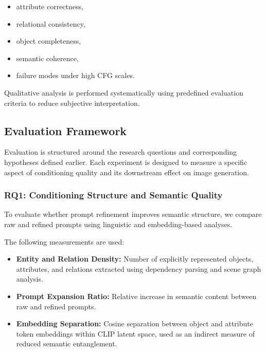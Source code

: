 \documentclass[a4paper,twoside,12pt]{report}
\begin{document}
\begin{itemize}
    \item attribute correctness,
    \item relational consistency,
    \item object completeness,
    \item semantic coherence,
    \item failure modes under high CFG scales.
\end{itemize}

Qualitative analysis is performed systematically using predefined evaluation criteria to reduce subjective interpretation.

\subsection{Evaluation Framework}
\label{sec:eval}

Evaluation is structured around the research questions and corresponding hypotheses defined earlier. Each experiment is designed to measure a specific aspect of conditioning quality and its downstream effect on image generation.

\subsubsection{RQ1: Conditioning Structure and Semantic Quality}

To evaluate whether prompt refinement improves semantic structure, we compare raw and refined prompts using linguistic and embedding-based analyses.

The following measurements are used:

\begin{itemize}
    \item \textbf{Entity and Relation Density:} Number of explicitly represented objects, attributes, and relations extracted using dependency parsing and scene graph analysis.

    \item \textbf{Prompt Expansion Ratio:} Relative increase in semantic content between raw and refined prompts.

    \item \textbf{Embedding Separation:} Cosine separation between object and attribute token embeddings within CLIP latent space, used as an indirect measure of reduced semantic entanglement.
\end{itemize}
\end{document}
